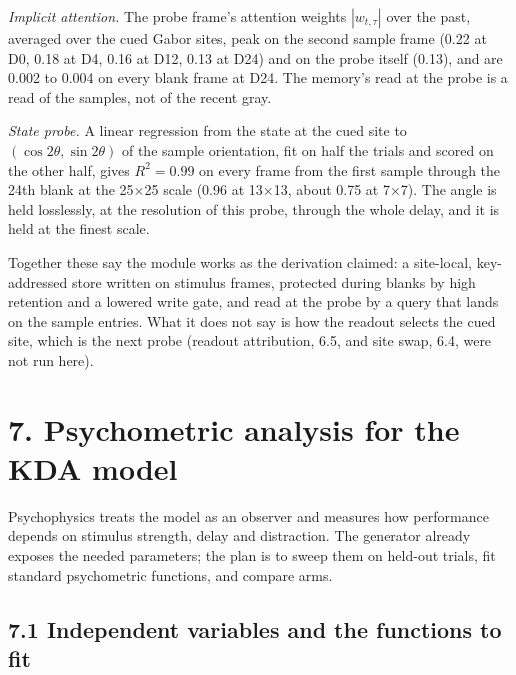 \documentclass[

]{article}
\begin{document}
\emph{Implicit attention.} The probe frame's attention weights \(|w_{t,\tau}|\) over the past, averaged over the cued Gabor sites, peak on the second sample frame (0.22 at D0, 0.18 at D4, 0.16 at D12, 0.13 at D24) and on the probe itself (0.13), and are 0.002 to 0.004 on every blank frame at D24. The memory's read at the probe is a read of the samples, not of the recent gray.



\emph{State probe.} A linear regression from the state at the cued site to \((\cos2\theta,\sin2\theta)\) of the sample orientation, fit on half the trials and scored on the other half, gives \(R^2=0.99\) on every frame from the first sample through the 24th blank at the 25×25 scale (0.96 at 13×13, about 0.75 at 7×7). The angle is held losslessly, at the resolution of this probe, through the whole delay, and it is held at the finest scale.



Together these say the module works as the derivation claimed: a site-local, key-addressed store written on stimulus frames, protected during blanks by high retention and a lowered write gate, and read at the probe by a query that lands on the sample entries. What it does not say is how the readout selects the cued site, which is the next probe (readout attribution, 6.5, and site swap, 6.4, were not run here).



\section{7. Psychometric analysis for the KDA model}\label{psychometric-analysis-for-the-kda-model}



Psychophysics treats the model as an observer and measures how performance depends on stimulus strength, delay and distraction. The generator already exposes the needed parameters; the plan is to sweep them on held-out trials, fit standard psychometric functions, and compare arms.



\subsection{7.1 Independent variables and the functions to fit}\label{independent-variables-and-the-functions-to-fit}
\end{document}
